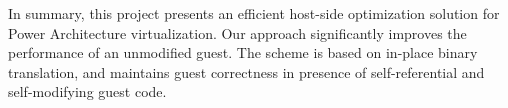 In summary, this project presents an efficient host-side optimization solution for Power Architecture virtualization. Our approach significantly improves the performance of an unmodified guest. The scheme is based on in-place binary translation, and maintains guest correctness in presence of self-referential and self-modifying guest code.

